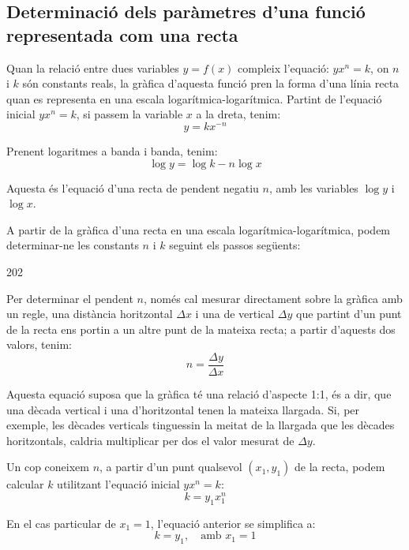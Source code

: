 \subsection{Determinació dels paràmetres d'una funció representada com una recta}\label{sec:escales-log-yxnk}

Quan la relació entre dues variables $y=f(x)$ compleix l'equació: $y x^n = k$, on $n$ i $k$  són constants  reals, la gràfica d'aquesta funció pren la forma d'una línia recta quan es representa en una escala logarítmica-logarítmica. Partint de l'equació inicial $y x^n = k$, si passem la variable $x$ a la dreta, tenim:
\begin{equation}
  y = k x^{-n}
\end{equation}

Prenent logaritmes a banda i banda, tenim:
\begin{equation}
  \log y = \log k - n \log x
\end{equation}

Aquesta és l'equació d'una recta de pendent negatiu $n$, amb les variables $\log y$ i $\log x$.

A partir de la gràfica d'una recta en una escala logarítmica-logarítmica, podem determinar-ne les constants $n$ i $k$ seguint els passos següents:

\begin{dingautolist}{202}
    \item Per  determinar el pendent $n$, només cal mesurar directament sobre la gràfica amb un regle, una distància horitzontal $\Delta{}x$ i una de vertical $\Delta{}y$ que partint d'un punt de la recta ens portin a un altre punt de la mateixa recta; a partir d'aquests dos valors, tenim:
        \begin{equation}
          n = \frac{\Delta{}y}{\Delta{}x}
        \end{equation}

        Aquesta equació suposa que la gràfica té una relació d'aspecte  1:1, és a dir, que una dècada vertical i una d'horitzontal tenen la mateixa llargada. Si, per exemple, les dècades verticals tinguessin la meitat de la llargada que les dècades  horitzontals, caldria multiplicar per dos el valor mesurat de $\Delta{}y$.

   \item  Un cop  coneixem $n$, a partir d'un punt qualsevol $(x_1, y_1)$ de la recta, podem calcular $k$ utilitzant l'equació inicial $y x^n = k$:
        \begin{equation}
          k =  y_1 x_1^n
        \end{equation}

        En el cas particular de $x_1=1$, l'equació anterior se simplifica a:\begin{equation}
           k = y_1, \quad \text{amb }x_1=1
        \end{equation}
\end{dingautolist}


